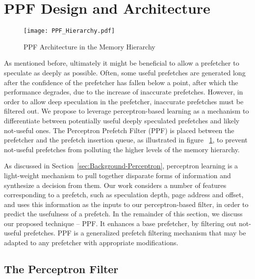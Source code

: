 \section{PPF Design and Architecture}
\label{Arch}

\begin{figure}
  \begin{center}
  \texttt{[image: PPF\_Hierarchy.pdf]}
    \label{fig:PPF_Hierarchy}
  \caption{PPF Architecture in the Memory Hierarchy}
  \end{center}
\end{figure}

As mentioned before, ultimately it might be beneficial to allow a
prefetcher to speculate as deeply as possible. Often, some useful
prefetches are generated long after the confidence of the prefetcher has
fallen below a point, after which the performance degrades, due to the
increase of inaccurate prefetches.  However, in order to allow deep
speculation in the prefetcher, inaccurate prefetches must be
filtered out.  We propose to leverage perceptron-based learning as a
mechanism to differentiate between potentially useful deeply speculated
prefetches and likely not-useful ones. The Perceptron Prefetch Filter (PPF)
is placed between the prefetcher and the prefetch insertion queue, as illustrated
in figure ~\ref{fig:PPF_Hierarchy}, to prevent
not-useful prefetches from polluting the higher levels of the memory hierarchy.

As discussed in Section~\ref{sec:Background-Perceptron}, perceptron learning
is a light-weight mechanism to pull together disparate forms of information
and synthesize a decision from them.  Our work considers a number of
features corresponding to a prefetch, such as speculation
depth, page address and offset, and uses this information as the inputs to our 
perceptron-based filter, in order to predict the usefulness of a prefetch.
In the remainder of this section, we discuss our proposed technique -- PPF.
It enhances a base prefetcher, by filtering out not-useful prefetches. 
PPF is a generalized prefetch filtering mechanism that may be adapted 
to any prefetcher with appropriate modifications.

\subsection{The Perceptron Filter}
\label{Arch-Perceptron}

